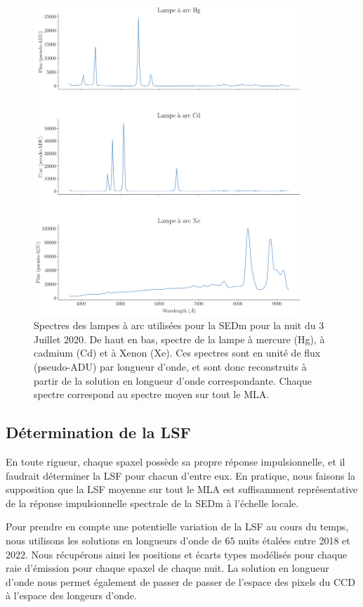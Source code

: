 \documentclass[../main/main.tex]{subfiles}
\begin{document}
\begin{figure}[h!]
  \centering
  \includegraphics[width=0.9\textwidth]{../figures/06_irf/arclamps.png}
  \caption[Spectres des lampes à arc utilisées pour la SEDm]{Spectres
    des lampes à arc utilisées pour la SEDm pour la nuit du 3 Juillet
    2020. De haut en bas, spectre de la lampe à mercure (Hg), à cadmium
    (Cd) et à Xenon (Xe). Ces spectres sont en unité de flux
    (pseudo-ADU) par longueur d'onde, et sont donc reconstruits à partir
  de la solution en longueur d'onde correspondante. Chaque spectre
  correspond au spectre moyen sur tout le MLA.}
  \label{fig:arclamps}
\end{figure}

\subsection{Détermination de la LSF}

En toute rigueur, chaque spaxel possède sa propre réponse
impulsionnelle, et il faudrait déterminer la LSF pour chacun d'entre
eux. En pratique, nous faisons la supposition que la LSF moyenne sur
tout le MLA est suffisamment représentative de la réponse impulsionnelle
spectrale de la SEDm à l'échelle locale.

Pour prendre en compte une potentielle variation de la LSF au cours du
temps, nous utilisons les solutions en longueurs d'onde de $65$ nuits
étalées entre 2018 et 2022. Nous récupérons ainsi les positions et
écarts types modélisés pour chaque raie d'émission pour chaque spaxel de
chaque nuit. La solution en longueur d'onde nous permet également de
passer de passer de l'espace des pixels du CCD à l'espace des longeurs d'onde.
\end{document}
